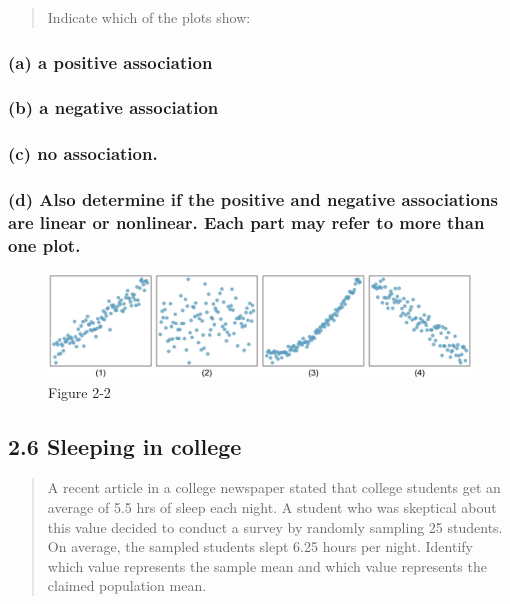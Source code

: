 \documentclass[
]{article}
\begin{document}
\begin{quote}
Indicate which of the plots show:
\end{quote}

\subsubsection{(a) a positive
association}\label{a-a-positive-association}

\subsubsection{(b) a negative
association}\label{b-a-negative-association}

\subsubsection{(c) no association.}\label{c-no-association.}

\subsubsection{(d) Also determine if the positive and negative
associations are linear or nonlinear. Each part may refer to more than
one
plot.}\label{d-also-determine-if-the-positive-and-negative-associations-are-linear-or-nonlinear.-each-part-may-refer-to-more-than-one-plot.}

\begin{figure}
\centering
\includegraphics{./assets/2-2.jpg}
\caption{Figure 2-2}
\end{figure}

\subsection{2.6 Sleeping in college}\label{sleeping-in-college}

\begin{quote}
A recent article in a college newspaper stated that college students get
an average of 5.5 hrs of sleep each night. A student who was skeptical
about this value decided to conduct a survey by randomly sampling 25
students. On average, the sampled students slept 6.25 hours per night.
Identify which value represents the sample mean and which value
represents the claimed population mean.
\end{quote}
\end{document}
